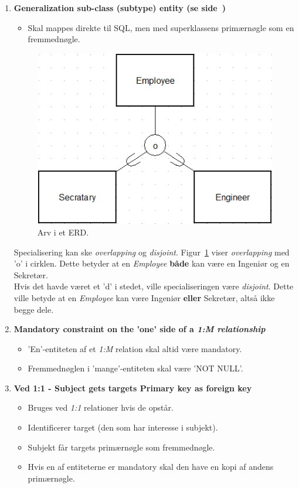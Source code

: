 \begin{enumerate}
	\item \textbf{Generalization sub-class (subtype) entity (se side~\pageref{sec:arv})}
	\begin{itemize}
		\item Skal mappes direkte til SQL, men med superklassens primærnøgle som en fremmednøgle.
	\end{itemize}
	
	\begin{figure}[H]
		\centering
		\includegraphics[width=0.5\linewidth]{figs/spm3/arv}
		\caption{Arv i et ERD. }
		\label{fig:arv1}
	\end{figure}
	
	Specialisering kan ske \textit{overlapping} og \textit{disjoint}. 
	Figur~\ref{fig:arv1} viser \textit{overlapping} med 'o' i cirklen. Dette betyder at en \textit{Employee} \textbf{både} kan være en Ingeniør og en Sekretær.\\
	
	Hvis det havde været et 'd' i stedet, ville specialiseringen være \textit{disjoint}. Dette ville betyde at en \textit{Employee} kan være Ingeniør \textbf{eller} Sekretær, altså ikke begge dele. 
	
	
	\item \textbf{Mandatory constraint on the 'one' side of a \textit{1:M relationship}}
	\begin{itemize}
		\item 'En'-entiteten af et \textit{1:M} relation skal altid være mandatory.
		\item Fremmednøglen i 'mange'-entiteten skal være 'NOT NULL'.
	\end{itemize}
		
	\item \textbf{Ved 1:1 - Subject gets targets Primary key as foreign key}
	\begin{itemize}
		\item Bruges ved \textit{1:1} relationer hvis de opstår.
		\item Identificerer target (den som har interesse i subjekt).
		\item Subjekt får targets primærnøgle som fremmednøgle.
		\item Hvis en af entiteterne er mandatory skal den have en kopi af andens primærnøgle.
	\end{itemize}
	
\end{enumerate}

